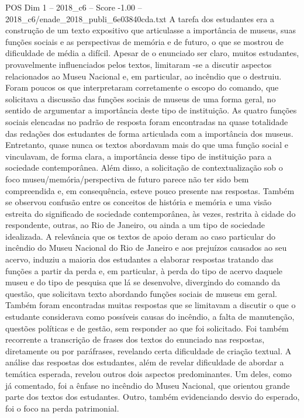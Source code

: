 \begin{textsample}{POS Dim 1 – 2018\_c6 – Score -1.00 – 2018\_c6/enade\_2018\_publi\_6e03840cda.txt}
A tarefa dos estudantes era a construção de um texto expositivo que articulasse a importância de museus, suas funções sociais e as perspectivas de memória e de futuro, o que se mostrou de dificuldade de média a difícil.
Apesar de o enunciado ser claro, muitos estudantes, provavelmente influenciados pelos textos, limitaram -se a discutir aspectos relacionados ao Museu Nacional e, em particular, ao incêndio que o destruiu.
Foram poucos os que interpretaram corretamente o escopo do comando, que solicitava a discussão das funções sociais de museus de uma forma geral, no sentido de argumentar a importância deste tipo de instituição.
As quatro funções sociais elencadas no padrão de resposta foram encontradas na quase totalidade das redações dos estudantes de forma articulada com a importância dos museus.
Entretanto, quase nunca os textos abordavam mais do que uma função social e vinculavam, de forma clara, a importância desse tipo de instituição para a sociedade contemporânea.
Além disso, a solicitação de contextualização sob o foco museu/memória/perspectiva de futuro parece não ter sido bem compreendida e, em consequência, esteve pouco presente nas respostas.
Também se observou confusão entre os conceitos de história e memória e uma visão estreita do significado de sociedade contemporânea, às vezes, restrita à cidade do respondente, outras, ao Rio de Janeiro, ou ainda a um tipo de sociedade idealizada.
A relevância que os textos de apoio deram ao caso particular do incêndio do Museu Nacional do Rio de Janeiro e aos prejuízos causados ao seu acervo, induziu a maioria dos estudantes a elaborar respostas tratando das funções a partir da perda e, em particular, à perda do tipo de acervo daquele museu e do tipo de pesquisa que lá se desenvolve, divergindo do comando da questão, que solicitava texto abordando funções sociais de museus em geral.
Também foram encontradas muitas respostas que se limitavam a discutir o que o estudante considerava como possíveis causas do incêndio, a falta de manutenção, questões políticas e de gestão, sem responder ao que foi solicitado.
Foi também recorrente a transcrição de frases dos textos do enunciado nas respostas, diretamente ou por paráfrases, revelando certa dificuldade de criação textual.
A análise das respostas dos estudantes, além de revelar dificuldade de abordar a temática esperada, revelou outros dois aspectos predominantes.
Um deles, como já comentado, foi a ênfase no incêndio do Museu Nacional, que orientou grande parte dos textos dos estudantes.
Outro, também evidenciando desvio do esperado, foi o foco na perda patrimonial.

\end{textsample}
